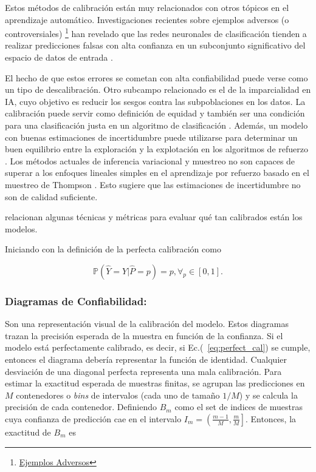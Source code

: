 \documentclass[10pt, oneside, a4paper]{article}
\begin{document}
	Estos métodos de calibración están muy relacionados con otros tópicos en el aprendizaje automático. Investigaciones recientes sobre ejemplos adversos (o controversiales) \footnote{\href{https://christophm.github.io/interpretable-ml-book/adversarial.html}{Ejemplos Adversos}} han revelado que las redes neuronales de clasificación tienden a realizar predicciones falsas con alta confianza en un subconjunto significativo del espacio de datos de entrada \cite{goodfellow2014explaining}. 
	
	El hecho de que estos errores se cometan con alta confiabilidad puede verse como un tipo de descalibración. Otro subcampo relacionado es el de la imparcialidad en IA, cuyo objetivo es reducir los sesgos contra las subpoblaciones en los datos. La calibración puede servir como definición de equidad \cite{kleinberg2016inherent} y también ser una condición para una clasificación justa en un algoritmo de clasificación \cite{pleiss2017fairness}. Además, un modelo con buenas estimaciones de incertidumbre puede utilizarse para determinar un buen equilibrio entre la exploración y la explotación en los algoritmos de refuerzo \cite{blundell2015weight}. Los métodos actuales de inferencia variacional y muestreo no son capaces de superar a los enfoques lineales simples en el aprendizaje por refuerzo basado en el muestreo de Thompson \cite{riquelme2018deep}. Esto sugiere que las estimaciones de incertidumbre no son de calidad suficiente.
	
	\cite{vasilev2023calibration, guo2017calibration} relacionan algunas técnicas y métricas para evaluar qué tan calibrados están los modelos. 

	Iniciando con la definición de la perfecta calibración como
	
	\begin{equation}\label{eq:perfect_cal}
	\mathbb{P} (\hat{Y} = Y | \hat{P} = p) = p, \forall_{p} \in [0,1].
	\end{equation}
	
	\subsubsection{Diagramas de Confiabilidad:}	\label{conf_diagrama}
	
	Son una representación visual de la calibración del modelo. Estos diagramas trazan la precisión esperada de la muestra en función de la confianza. Si el modelo está perfectamente calibrado, es decir, si Ec.(~\ref{eq:perfect_cal}) se cumple, entonces el diagrama debería representar la función de identidad. Cualquier desviación de una diagonal perfecta representa una mala calibración. Para estimar la exactitud esperada de muestras finitas, se agrupan las predicciones en $M$ contenedores o \textsl{bins} de intervalos (cada uno de tamaño $1/M$) y se calcula la precisión de cada contenedor. Definiendo $B_{m}$ como el set de indices de muestras cuya confianza de predicción cae en el intervalo $I_{m} = \left( \frac{m-1}{M}, \frac{m}{M} \right]$. Entonces, la exactitud de $B_{m}$ es
	
\end{document}
